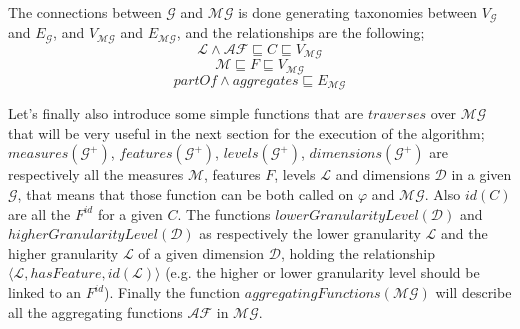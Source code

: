 \documentclass[12pt,a4paper]{report}
\newcommand\globalQuery{\varphi}
\newcommand\targetGraph{\mathcal{G}}
\newcommand\targetGraphVertex{V_{\targetGraph}}
\newcommand\targetGraphEdge{E_{\targetGraph}}
\newcommand\targetMultidimensionalGraphVertex{V_{\multidimensionalGraph}}
\newcommand\targetMultidimensionalGraphEdge{E_{\multidimensionalGraph}}
\newcommand\concept{C}
\newcommand\feature{F}
\newcommand\idFeature{\feature^{id}}
\newcommand\dimension{\mathcal{D}}
\newcommand\level{\mathcal{L}}
\newcommand\measure{\mathcal{M}}
\newcommand\dimensions{dimensions}
\newcommand\multidimensionalGraph{\mathcal{MG}}
\newcommand\aggregatingFunction{\mathcal{AF}}
\newcommand\aggregatingFunctionFunLabel{aggregates}
\newcommand\partOfFunLabel{partOf}
\newcommand\id{id}
\newcommand\levels{levels}
\newcommand\measures{measures}
\newcommand\features{features}
\newcommand\aggregatingFunctions{aggregatingFunctions}
\newcommand\lowerGranularityLevel{lowerGranularityLevel(\dimension)}
\newcommand\higherGranularityLevel{higherGranularityLevel(\dimension)}
\newcommand\set[1]{\langle #1 \rangle}
\begin{document}
The connections between $\targetGraph$ and $\multidimensionalGraph$ is done generating taxonomies between $\targetGraphVertex$ and $\targetGraphEdge$, and $\targetMultidimensionalGraphVertex$ and $\targetMultidimensionalGraphEdge$, and the relationships are the following; 
\begin{equation}
    \level \land \aggregatingFunction \sqsubseteq \concept \sqsubseteq \targetMultidimensionalGraphVertex
\end{equation}
\begin{equation}
    \measure \sqsubseteq \feature \sqsubseteq \targetMultidimensionalGraphVertex
\end{equation}
\begin{equation}
    \partOfFunLabel \land \aggregatingFunctionFunLabel \sqsubseteq \targetMultidimensionalGraphEdge
\end{equation}

Let's finally also introduce some simple functions that are $traverses$ over $\multidimensionalGraph$ that will be very useful in the next section for the execution of the algorithm; 
%
$\measures(\targetGraph^{+})$, $\features(\targetGraph^{+})$, $\levels(\targetGraph^{+})$, $\dimensions(\targetGraph^{+})$ are respectively all the measures $\measure$, features $\feature$, levels $\level$ and dimensions $\dimension$ in a given $\targetGraph$, that means that those function can be both called on $\globalQuery$ and $\multidimensionalGraph$.
%
Also $\id(\concept)$ are all the $\idFeature$ for a given $\concept$.
%
The functions $ \lowerGranularityLevel $ and $ \higherGranularityLevel $ as respectively the lower granularity $\level$ and the higher granularity $\level$ of a given dimension $\dimension$, holding the relationship $\set{\level,hasFeature,\id(\level)}$ (e.g. the higher or lower granularity level should be linked to an $\idFeature$).
%
Finally the function $\aggregatingFunctions(\multidimensionalGraph)$ will describe all the aggregating functions $\aggregatingFunction$ in $\multidimensionalGraph$.
%
\end{document}
